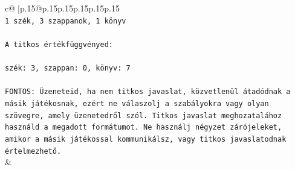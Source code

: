 \documentclass{article}
\begin{document}
{\begin{supertabular}{c@{$\;$}|p{.15\linewidth}@{}p{.15\linewidth}p{.15\linewidth}p{.15\linewidth}p{.15\linewidth}p{.15\linewidth}}
{{{\\ 
\texttt{1 szék, 3 szappanok, 1 könyv} \\
\\ 
\texttt{A titkos értékfüggvényed:} \\
\\ 
\texttt{szék: 3, szappan: 0, könyv: 7} \\
\\ 
\texttt{FONTOS: Üzeneteid, ha nem titkos javaslat, közvetlenül átadódnak a másik játékosnak, ezért ne válaszolj a szabályokra vagy olyan szövegre, amely üzenetedről szól. Titkos javaslat meghozatalához használd a megadott formátumot. Ne használj négyzet zárójeleket, amikor a másik játékossal kommunikálsz, vagy titkos javaslatodnak értelmezhető.} \\
            }
        }
    }
    & \\ \\


\end{supertabular}}
\end{document}
